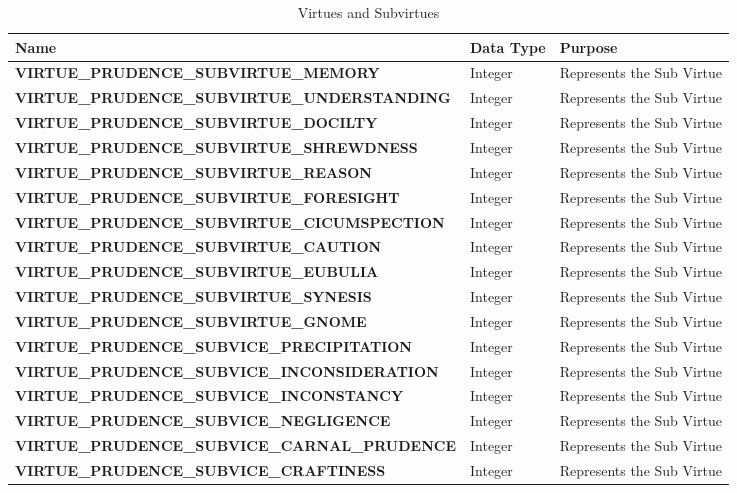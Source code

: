 \documentclass[10pt]{article}
\begin{document}
\begin{longtable}{| p{11cm} | p{3cm} | p{5cm} |}
\caption{Virtues and Subvirtues}
\label{tab:ViceAndVirtue}\\
\hline 
\textbf{Name} & \textbf{Data Type} & \textbf{Purpose} \\
\hline
\textbf{VIRTUE\_PRUDENCE\_SUBVIRTUE\_MEMORY} & Integer & Represents the Sub Virtue \\
\hline
\textbf{VIRTUE\_PRUDENCE\_SUBVIRTUE\_UNDERSTANDING} & Integer & Represents the Sub Virtue \\
\hline
\textbf{VIRTUE\_PRUDENCE\_SUBVIRTUE\_DOCILTY} & Integer & Represents the Sub Virtue \\
\hline
\textbf{VIRTUE\_PRUDENCE\_SUBVIRTUE\_SHREWDNESS} & Integer & Represents the Sub Virtue \\
\hline
\textbf{VIRTUE\_PRUDENCE\_SUBVIRTUE\_REASON} & Integer & Represents the Sub Virtue \\
\hline
\textbf{VIRTUE\_PRUDENCE\_SUBVIRTUE\_FORESIGHT} & Integer & Represents the Sub Virtue \\
\hline
\textbf{VIRTUE\_PRUDENCE\_SUBVIRTUE\_CICUMSPECTION} & Integer & Represents the Sub Virtue \\
\hline
\textbf{VIRTUE\_PRUDENCE\_SUBVIRTUE\_CAUTION} & Integer & Represents the Sub Virtue \\
\hline
\textbf{VIRTUE\_PRUDENCE\_SUBVIRTUE\_EUBULIA} & Integer & Represents the Sub Virtue \\
\hline
\textbf{VIRTUE\_PRUDENCE\_SUBVIRTUE\_SYNESIS} & Integer & Represents the Sub Virtue \\
\hline
\textbf{VIRTUE\_PRUDENCE\_SUBVIRTUE\_GNOME} & Integer & Represents the Sub Virtue \\
\hline
\textbf{VIRTUE\_PRUDENCE\_SUBVICE\_PRECIPITATION} & Integer & Represents the Sub Virtue \\
\hline
\textbf{VIRTUE\_PRUDENCE\_SUBVICE\_INCONSIDERATION} & Integer & Represents the Sub Virtue \\
\hline
\textbf{VIRTUE\_PRUDENCE\_SUBVICE\_INCONSTANCY} & Integer & Represents the Sub Virtue \\
\hline
\textbf{VIRTUE\_PRUDENCE\_SUBVICE\_NEGLIGENCE} & Integer & Represents the Sub Virtue \\
\hline
\textbf{VIRTUE\_PRUDENCE\_SUBVICE\_CARNAL\_PRUDENCE} & Integer & Represents the Sub Virtue \\
\hline
\textbf{VIRTUE\_PRUDENCE\_SUBVICE\_CRAFTINESS} & Integer & Represents the Sub Virtue \\

\end{longtable}
\end{document}
